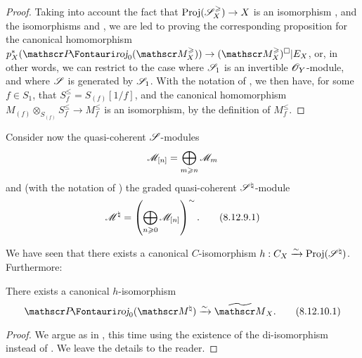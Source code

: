 \begin{proof}
\label{proof-2.8.12.8}
Taking into account the fact that $\Proj(\sh{S}_X^\geq)\to X$ is an isomorphism , and the
isomorphisms  and , we are led to proving the corresponding proposition for the canonical homomorphism $p_X^*(\shProj_0(\sh{M}_X^\geq))\to(\sh{M}_X^\geq)^\square|E_X$, or, in other words, we can restrict to the case where $\mathscr{S}_1$ is an invertible $\mathscr{O}_Y$-module, and where $\mathscr{S}$ is generated by $\mathscr{S}_1$.
With the notation of , we then have, for some $f\in S_1$, that $S_f^\leq=S_{(f)}[1/f]$, and the canonical homomorphism $M_{(f)}\otimes_{S_{(f)}}S_f^\leq\to M_f^\leq$ is an isomorphism, by the definition of $M_f^\leq$.
\end{proof}

\begin{env}[8.12.9]
\label{II.8.12.9}
Consider now the quasi-coherent $\mathscr{S}$-modules
\[
    \mathscr{M}_{[n]}=\bigoplus_{m\geqslant n}\mathscr{M}_m
\]
and (with the notation of ) the graded quasi-coherent $\mathscr{S}^\natural$-module
\[
\label{II.8.12.9.1}
    \mathscr{M}^\natural=\left(\bigoplus_{n\geqslant0}\mathscr{M}_{[n]}\right)^\sim.
\tag{8.12.9.1}
\]

We have seen  that there exists a canonical $C$-isomorphism $h:C_X\xrightarrow{\sim}\operatorname{Proj}(\mathscr{S}^\natural)$.
Furthermore:
\end{env}

\begin{proposition}[8.12.10]
\label{II.8.12.10}
There exists a canonical $h$-isomorphism
\[
\label{II.8.12.10.1}
    \shProj_0(\sh{M}^\natural) \xrightarrow{\sim} \widetilde{\sh{M}}_X.
\tag{8.12.10.1}
\]
\end{proposition}

\begin{proof}
\label{proof-2.8.12.10}
We argue as in , this time using the existence of the di-isomorphism  instead of .
We leave the details to the reader.
\end{proof}

